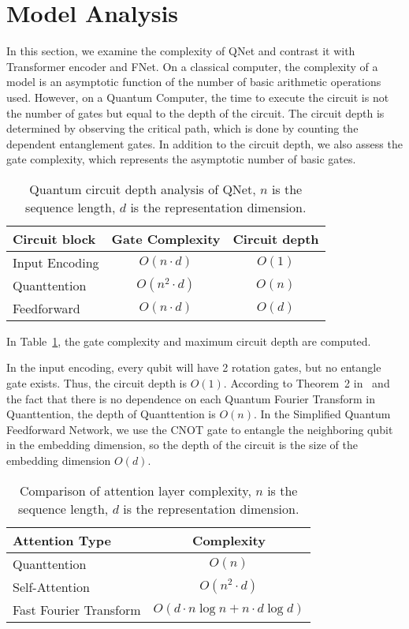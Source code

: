 \section{Model Analysis}

In this section, we examine the complexity of QNet and contrast it with Transformer encoder and FNet. On a classical computer, the complexity of a model is an asymptotic function of the number of basic arithmetic operations used. However, on a Quantum Computer, the time to execute the circuit is not the number of gates but equal to the depth of the circuit. The circuit depth is determined by observing the critical path, which is done by counting the dependent entanglement gates. In addition to the circuit depth, we also assess the gate complexity, which represents the asymptotic number of basic gates.

\begin{table}[htb!]
    \centering
    \begin{tabular}{ l|c|c  }
        \hline
        Circuit block & Gate Complexity & Circuit depth \\
        \hline
        Input Encoding & $O(n \cdot d)$ & $O(1)$ \\
        Quanttention &  $O(n^2 \cdot d)$ & $O(n)$ \\
        Feedforward &  $O(n \cdot d)$ & $O(d)$ \\
        \hline
    \end{tabular}
    \caption{Quantum circuit depth analysis of QNet, $n$ is the sequence length, $d$ is the representation dimension.}
    \label{table:depth}
\end{table}

In Table~\ref{table:depth}, the gate complexity and maximum circuit depth are computed.

In the input encoding, every qubit will have 2 rotation gates, but no entangle gate exists. Thus, the circuit depth is $O(1)$.
According to Theorem~2 in~\cite{892140} and the fact that there is no dependence on each Quantum Fourier Transform in Quanttention, the depth of Quanttention is $O(n)$.
In the Simplified Quantum Feedforward Network, we use the CNOT gate to entangle the neighboring qubit in the embedding dimension, so the depth of the circuit is the size of the embedding dimension $O(d)$.

\begin{table}[htb!]
    \centering
    \begin{tabular}{ l|c  }
        \hline
        Attention Type & Complexity\\
        \hline
        Quanttention & $O(n)$\\
        Self-Attention &  $O(n^2 \cdot d)$\\
        Fast Fourier Transform & $O(d \cdot  n \log n + n \cdot d \log d)$ \\
        \hline
    \end{tabular}
    \caption{Comparison of attention layer complexity, $n$ is the sequence length, $d$ is the representation dimension.}
    \label{table:attentions}
\end{table}

